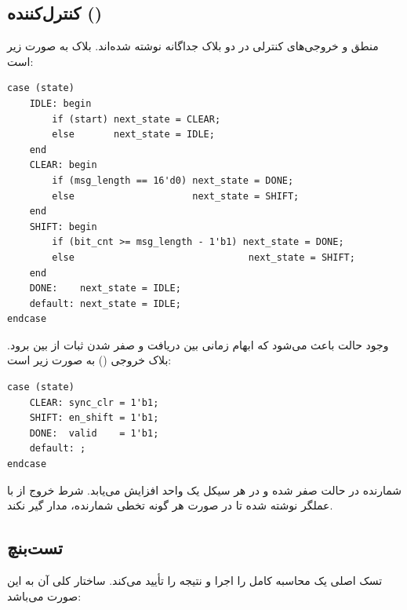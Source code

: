 \subsection{کنترل‌کننده ()}

منطق  و خروجی‌های کنترلی در دو بلاک  جداگانه
نوشته شده‌اند. بلاک  به صورت زیر است:

\begin{latin}
    \begin{lstlisting}[basicstyle=\ttfamily\small, breaklines=true,
                   postbreak=\mbox{\textcolor{red}{$\hookrightarrow$}\space}]
case (state)
    IDLE: begin
        if (start) next_state = CLEAR;
        else       next_state = IDLE;
    end
    CLEAR: begin
        if (msg_length == 16'd0) next_state = DONE;
        else                     next_state = SHIFT;
    end
    SHIFT: begin
        if (bit_cnt >= msg_length - 1'b1) next_state = DONE;
        else                               next_state = SHIFT;
    end
    DONE:    next_state = IDLE;
    default: next_state = IDLE;
endcase
\end{lstlisting}
\end{latin}

وجود حالت  باعث می‌شود که ابهام زمانی بین دریافت 
و صفر شدن ثبات  از بین برود. بلاک خروجی () به صورت
زیر است:

\begin{latin}
    \begin{lstlisting}[basicstyle=\ttfamily\small, breaklines=true,
                   postbreak=\mbox{\textcolor{red}{$\hookrightarrow$}\space}]
case (state)
    CLEAR: sync_clr = 1'b1;
    SHIFT: en_shift = 1'b1;
    DONE:  valid    = 1'b1;
    default: ;
endcase
\end{lstlisting}
\end{latin}

شمارنده  در حالت  صفر شده و در هر سیکل
 یک واحد افزایش می‌یابد. شرط خروج از  با عملگر
\code{>=} نوشته شده تا در صورت هر گونه تخطی شمارنده، مدار گیر نکند.

\pagebreak

\subsection{تست‌بنچ}

\textbf{}

تسک اصلی یک محاسبه کامل را اجرا و نتیجه را تأیید می‌کند. ساختار کلی
آن به این صورت می‌باشد:


